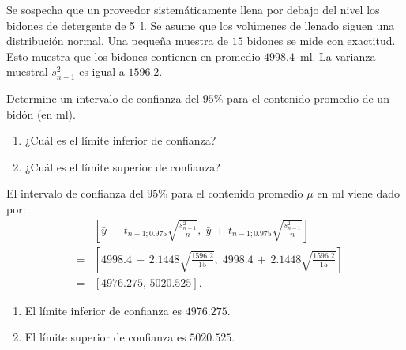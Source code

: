 \documentclass[a4paper]{article}
\newenvironment{question}{}{}
\newenvironment{solution}{}{}
\newenvironment{answerlist}{\begin{enumerate}}{\end{enumerate}}
\begin{document}




\begin{question}
Se sospecha que un proveedor sistemáticamente llena por debajo del nivel los bidones de detergente de 5~l.
Se asume que los volúmenes de llenado siguen una distribución normal. Una pequeña muestra de $15$
bidones se mide con exactitud. Esto muestra que los bidones contienen en promedio
$4998.4$~ml. La varianza muestral $s^2_{n-1}$ es igual a $1596.2$.

Determine un intervalo de confianza del $95\%$ para el contenido promedio de
un bidón (en ml).

\begin{answerlist}
\item ¿Cuál es el límite inferior de confianza?
\item ¿Cuál es el límite superior de confianza?
\end{answerlist}
\end{question}


\begin{solution}
El intervalo de confianza del $95\%$ para el contenido promedio $\mu$
en ml viene dado por:
\begin{eqnarray*}
&   & \left[\bar{y} \, - \, t_{n-1;0.975}\sqrt{\frac{s_{n-1}^2}{n}}, \;
  \bar{y} \, + \, t_{n-1;0.975}\sqrt{\frac{s_{n-1}^2}{n}}\right] \\
& = & \left[ 4998.4 \, - \, 2.1448\sqrt{\frac{1596.2}{15}}, \;
             4998.4 \, + \, 2.1448\sqrt{\frac{1596.2}{15}}\right] \\
& = & \left[4976.275, \, 5020.525\right].
\end{eqnarray*}

\begin{answerlist}
\item El límite inferior de confianza es $4976.275$.
\item El límite superior de confianza es $5020.525$.
\end{answerlist}
\end{solution}


\end{document}
